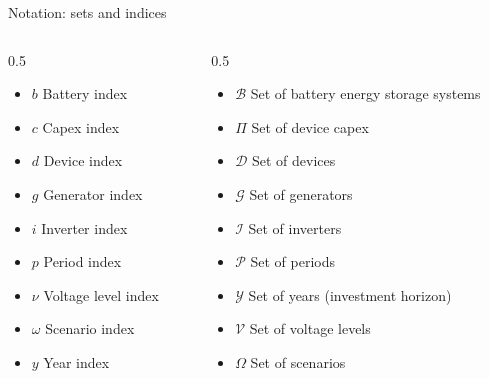 \begin{frame}{Notation: sets and indices}
\begin{columns}
\begin{column}{0.5\textwidth}    
\begin{itemize}
    \item $b$ Battery index
    \item $c$ Capex index
    \item $d$ Device index
    \item $g$ Generator index
    \item $i$ Inverter index
    \item $p$ Period index
    \item $\nu$ Voltage level index
    \item $\omega$ Scenario index
    \item $y$ Year index
\end{itemize}
\end{column}
\begin{column}{0.5\textwidth}
\begin{itemize}
    \item $\mathcal{B}$ Set of battery energy storage systems
    \item $\Pi$ Set of device capex
    \item $\mathcal{D}$ Set of devices
    \item $\mathcal{G}$ Set of generators
    \item $\mathcal{I}$ Set of inverters
    \item $\mathcal{P}$ Set of periods
    \item $\mathcal{Y}$ Set of years (investment horizon)
    \item $\mathcal{V}$ Set of voltage levels
    \item $\Omega$ Set of scenarios
\end{itemize}
\end{column}

\end{columns}

\end{frame}
